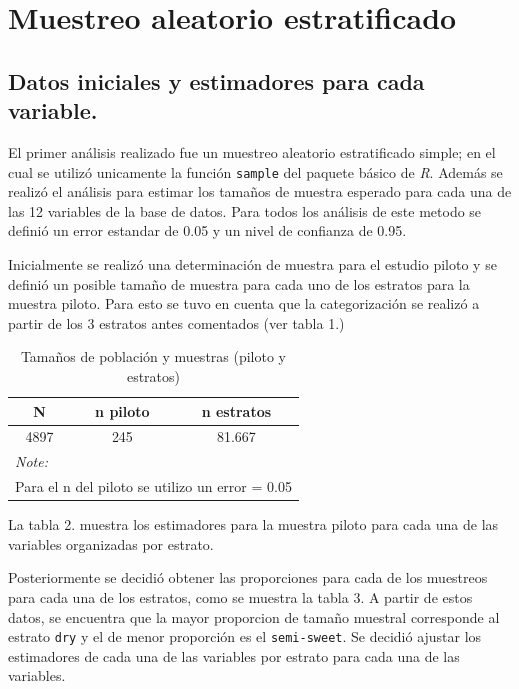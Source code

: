 \documentclass[
]{article}
\begin{document}
\hypertarget{muestreo-aleatorio-estratificado}{%
\section{Muestreo aleatorio
estratificado}\label{muestreo-aleatorio-estratificado}}

\hypertarget{datos-iniciales-y-estimadores-para-cada-variable.}{%
\subsection{Datos iniciales y estimadores para cada
variable.}\label{datos-iniciales-y-estimadores-para-cada-variable.}}

El primer análisis realizado fue un muestreo aleatorio estratificado
simple; en el cual se utilizó unicamente la función \texttt{sample} del
paquete básico de \emph{R}. Además se realizó el análisis para estimar
los tamaños de muestra esperado para cada una de las 12 variables de la
base de datos. Para todos los análisis de este metodo se definió un
error estandar de 0.05 y un nivel de confianza de 0.95.

Inicialmente se realizó una determinación de muestra para el estudio
piloto y se definió un posible tamaño de muestra para cada uno de los
estratos para la muestra piloto. Para esto se tuvo en cuenta que la
categorización se realizó a partir de los 3 estratos antes comentados
(ver tabla 1.)

\begin{table}[!h]

\caption{\label{tab:tabla_piloto_total}Tamaños de población y muestras (piloto y estratos)}
\centering
\fontsize{8}{10}\selectfont
\begin{tabular}[t]{c|c|c}
\hline
N & n piloto & n estratos\\
\hline
\rowcolor{gray!6}  4897 & 245 & 81.667\\
\hline
\multicolumn{3}{l}{\textit{Note: }}\\
\multicolumn{3}{l}{Para el n del piloto se utilizo un error = 0.05}\\
\end{tabular}
\end{table}

La tabla 2. muestra los estimadores para la muestra piloto para cada una
de las variables organizadas por estrato.

Posteriormente se decidió obtener las proporciones para cada de los
muestreos para cada una de los estratos, como se muestra la tabla 3. A
partir de estos datos, se encuentra que la mayor proporcion de tamaño
muestral corresponde al estrato \texttt{dry} y el de menor proporción es
el \texttt{semi-sweet}. Se decidió ajustar los estimadores de cada una
de las variables por estrato para cada una de las variables.
\end{document}
